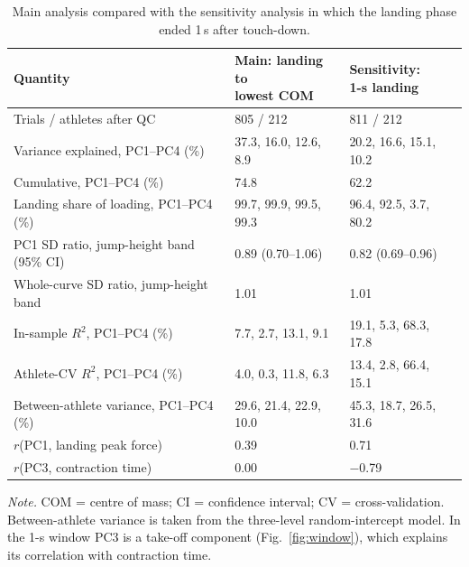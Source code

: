 \begin{table}[tbp]
\centering
\begin{threeparttable}
\caption{Main analysis compared with the sensitivity analysis in which the landing phase ended 1\,s after touch-down.}
\label{tab:window}
\footnotesize
\setlength{\tabcolsep}{3pt}
\begin{tabularx}{\linewidth}{@{}>{\raggedright\arraybackslash}Xll@{}}
\toprule
Quantity & \makecell[l]{Main: landing to\\lowest COM} & \makecell[l]{Sensitivity:\\1-s landing} \\
\midrule
Trials / athletes after QC & 805 / 212 & 811 / 212 \\
Variance explained, PC1--PC4 (\%) & 37.3, 16.0, 12.6, 8.9 & 20.2, 16.6, 15.1, 10.2 \\
Cumulative, PC1--PC4 (\%) & 74.8 & 62.2 \\
Landing share of loading, PC1--PC4 (\%) & 99.7, 99.9, 99.5, 99.3 & 96.4, 92.5, 3.7, 80.2 \\
PC1 SD ratio, jump-height band (95\% CI) & 0.89 (0.70--1.06) & 0.82 (0.69--0.96) \\
Whole-curve SD ratio, jump-height band & 1.01 & 1.01 \\
In-sample $R^2$, PC1--PC4 (\%) & 7.7, 2.7, 13.1, 9.1 & 19.1, 5.3, 68.3, 17.8 \\
Athlete-CV $R^2$, PC1--PC4 (\%) & 4.0, 0.3, 11.8, 6.3 & 13.4, 2.8, 66.4, 15.1 \\
Between-athlete variance, PC1--PC4 (\%) & 29.6, 21.4, 22.9, 10.0 & 45.3, 18.7, 26.5, 31.6 \\
$r$(PC1, landing peak force) & 0.39 & 0.71 \\
$r$(PC3, contraction time) & 0.00 & $-$0.79 \\
\bottomrule
\end{tabularx}
\begin{tablenotes}[flushleft]\footnotesize
\item \textit{Note.} COM = centre of mass; CI = confidence interval; CV = cross-validation. Between-athlete variance is taken from the three-level random-intercept model. In the 1-s window PC3 is a take-off component (Fig.~\ref{fig:window}), which explains its correlation with contraction time.
\end{tablenotes}
\end{threeparttable}
\end{table}
